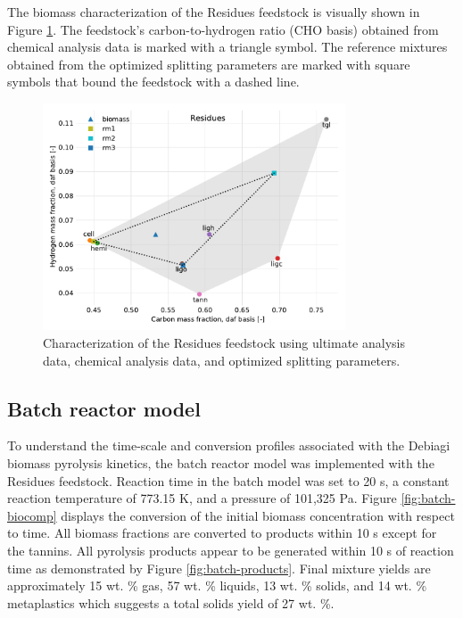 The biomass characterization of the Residues feedstock is visually shown in Figure \ref{fig:biocomp-diagram}. The feedstock's carbon-to-hydrogen ratio (CHO basis) obtained from chemical analysis data is marked with a triangle symbol. The reference mixtures obtained from the optimized splitting parameters are marked with square symbols that bound the feedstock with a dashed line.

\begin{figure}[H]
    \centering
    \includegraphics[width=0.8\textwidth]{figures/biocomp-diagram.pdf}
    \caption{Characterization of the Residues feedstock using ultimate analysis data, chemical analysis data, and optimized splitting parameters.}
    \label{fig:biocomp-diagram}
\end{figure}

\subsection{Batch reactor model}

To understand the time-scale and conversion profiles associated with the Debiagi biomass pyrolysis kinetics, the batch reactor model was implemented with the Residues feedstock. Reaction time in the batch model was set to 20 s, a constant reaction temperature of 773.15 K, and a pressure of 101,325 Pa. Figure \ref{fig:batch-biocomp} displays the conversion of the initial biomass concentration with respect to time. All biomass fractions are converted to products within 10 s except for the tannins. All pyrolysis products appear to be generated within 10 s of reaction time as demonstrated by Figure \ref{fig:batch-products}. Final mixture yields are approximately 15 wt. \% gas, 57 wt. \% liquids, 13 wt. \% solids, and 14 wt. \% metaplastics which suggests a total solids yield of 27 wt. \%.

